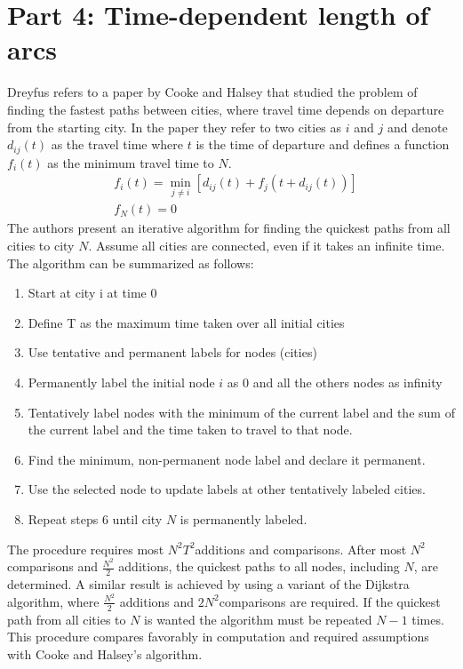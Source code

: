 \documentclass{article}
\begin{document}
\section*{Part 4: Time-dependent length of arcs}
Dreyfus refers to a paper by Cooke and Halsey\cite{halsey} that studied the problem of finding 
the fastest paths between cities, where travel time depends on departure 
from the starting city. In the paper they refer to two cities
as $i$ and $j$ and denote $d_{ij}(t)$ as the travel time where $t$ is the time of 
departure and defines a function $f_i(t)$ as the minimum travel time to $N$. 
\begin{equation}
    \begin{aligned}
        & f_i(t) = \min_{j \neq i}[d_{ij}(t)+f_j(t+d_{ij}(t))] \\
        & f_N(t) = 0
    \end{aligned}
\end{equation}
The authors present an iterative algorithm for finding the quickest 
paths from all cities to city $N$. Assume all cities are connected, even if it 
takes an infinite time. The algorithm can be summarized as follows:
\begin{enumerate}
    \item Start at city i at time 0 
    \item Define T as the maximum time taken over all initial cities 
    \item Use tentative and permanent labels for nodes (cities) 
    \item Permanently label the initial node $i$ as 0 and all the others nodes as infinity
    \item Tentatively label nodes with the minimum of the current label and the sum of the current label and the time taken to travel to that node.
    \item Find the minimum, non-permanent node label and declare it permanent.
    \item Use the selected node to update labels at other tentatively labeled cities.
    \item Repeat steps 6 until city $N$ is permanently labeled.
\end{enumerate}

\noindent The procedure requires most $N^{2}T^{2}$additions and comparisons.
After most $N^{2}$ comparisons and $\frac{N^{2}}{2}$ additions, 
the quickest paths to all nodes, including $N$, are determined. A similar 
result is achieved by using a variant of the Dijkstra algorithm, where $\frac{N^{2}}{2}$
additions and $2N^{2}$comparisons are required. If the quickest path from all 
cities to $N$ is wanted the algorithm must be repeated $N-1$ times. This 
procedure compares favorably in computation and required assumptions with 
Cooke and Halsey's algorithm.
\end{document}
